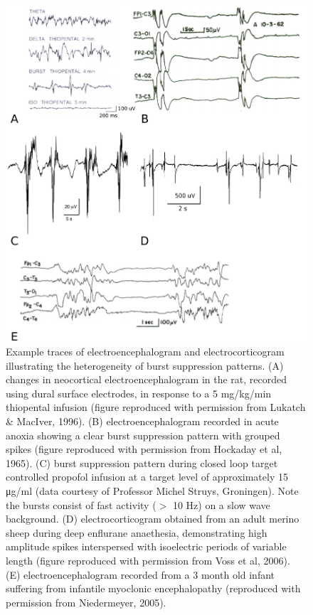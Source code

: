 \documentclass[a4paper,12pt]{article}
\begin{document}
\begin{figure}
	\label{fig:burst_examples}
	\includegraphics[scale=0.7]{chosen-frontiers-2012/burst_examples.pdf}
	\caption{Example traces of electroencephalogram and
electrocorticogram illustrating the heterogeneity of burst suppression
patterns. (A) changes in neocortical electroencephalogram in the rat,
recorded using dural surface electrodes, in response to a 5 mg/kg/min
thiopental infusion (figure reproduced with permission from Lukatch \&
MacIver, 1996). (B) electroencephalogram recorded in acute anoxia
showing a clear burst suppression pattern with grouped spikes (figure
reproduced with permission from Hockaday et al, 1965). (C) burst
suppression pattern during closed loop target controlled propofol
infusion at a target level of approximately 15 μg/ml (data courtesy of
Professor Michel Struys, Groningen). Note the bursts consist of fast
activity ($>$ 10 Hz) on a slow wave background. (D) electrocorticogram
obtained from an adult merino sheep during deep enflurane anaethesia,
demonstrating high amplitude spikes interspersed with isoelectric
periods of variable length (figure reproduced with permission from
Voss et al, 2006). (E) electroencephalogram recorded from a 3 month
old infant suffering from infantile myoclonic encephalopathy
(reproduced with permission from Niedermeyer, 2005).}
\end{figure}
\end{document}
